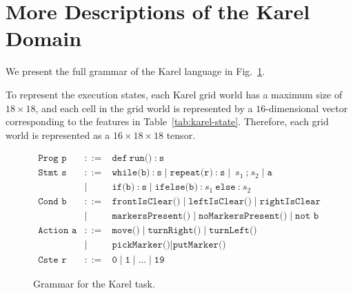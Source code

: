 \section{More Descriptions of the Karel Domain}
\label{app:karel-details}

We present the full grammar of the Karel language in Fig.~\ref{fig:karel-grammar}.

To represent the execution states, each Karel grid world has a maximum size of $18\times 18$, and each cell in the grid world is represented by a $16$-dimensional vector corresponding to the features in Table~\ref{tab:karel-state}. Therefore, each grid world is represented as a $16\times 18\times 18$ tensor.

\begin{figure}[h]
$$
\begin{array}{rcl}
\texttt{Prog p} & ::= & \texttt{def}~\texttt{run()}~\texttt{:}~\texttt{s} \\
\texttt{Stmt s} & ::= & \texttt{while(b)}~\texttt{:}~\texttt{s} \mid \texttt{repeat(r)}~\texttt{:}~\texttt{s} \mid~\texttt{$s_1$}~\texttt{;}~\texttt{$s_2$} \mid \texttt{a} \\
& | & \texttt{if(b)}~\texttt{:}~\texttt{s} \mid \texttt{ifelse(b)}~\texttt{:}~\texttt{$s_1$}~\texttt{else}~\texttt{:}~\texttt{$s_2$} \\
\texttt{Cond b} & ::= & \texttt{frontIsClear()} \mid \texttt{leftIsClear()} \mid \texttt{rightIsClear} \\
& | & \texttt{markersPresent()} \mid \texttt{noMarkersPresent()} \mid \texttt{not b} \\
\texttt{Action a} & ::= & \texttt{move()} \mid \texttt{turnRight()} \mid \texttt{turnLeft()} \\
& | & \texttt{pickMarker()} \mid \texttt{putMarker()} \\
\texttt{Cste r} & ::= & \texttt{0} \mid \texttt{1} \mid \texttt{...} \mid \texttt{19}
\end{array}
$$
\caption{Grammar for the Karel task.}
\label{fig:karel-grammar}
\end{figure}


